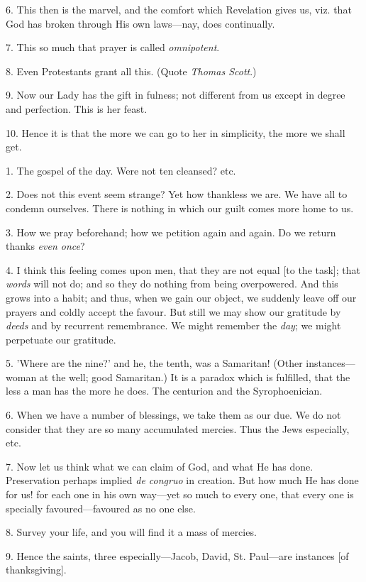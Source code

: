 6. This then is the marvel, and the comfort which
Revelation gives us, viz. that God has broken through His own
laws—nay, does continually.

7. This so much that prayer is called \emph{omnipotent}.

8. Even Protestants grant all this. (Quote \emph{Thomas
Scott}.)

9. Now our Lady has the gift in fulness; not
different from us except in degree and perfection. This is her feast.

10. Hence it is that the more we can go to her in
simplicity, the more we shall get.


1. The gospel of the day. Were not ten cleansed?
etc.

2. Does not this event seem strange? Yet how
thankless we are. We have all to condemn ourselves. There is nothing
in which our guilt comes more home to us.

3. How we pray beforehand; how we petition again
and again. Do we return thanks \emph{even once}?

4. I think this feeling comes upon men, that they
are not equal [to the task]; that \emph{words} will not do; and so
they do nothing from being overpowered. And this grows into a habit;
and thus, when we gain our object, we suddenly leave off our prayers
and coldly accept the favour. But still we may show our gratitude by \emph{deeds}
and by recurrent remembrance. We might remember the \emph{day}; we
might perpetuate our gratitude.

5. 'Where are the nine?' and he, the tenth, was a
Samaritan! (Other instances—woman at the well; good Samaritan.) It
is a paradox which is fulfilled, that the less a man has the more he
does. The centurion and the Syrophoenician.

6. When we have a number of blessings, we take
them as our due. We do not consider that they are so many accumulated
mercies. Thus the Jews especially, etc.

7. Now let us think what we can claim of God, and
what He has done. Preservation perhaps implied \emph{de congruo} in
creation. But how much He has done for us! for each one in his own
way—yet so much to every one, that every one is specially favoured—favoured
as no one else.

8. Survey your life, and you will find it a mass
of mercies.

9. Hence the saints, three especially—Jacob,
David, St. Paul—are instances [of thanksgiving].

